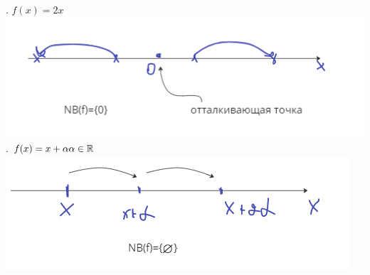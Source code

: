 \documentclass[12pt,a4paper]{article}
\begin{document}
\\
. \(f(x)=2x\) 
\newline \includegraphics[scale=0.5]{images/Section 3. Dinamic System/kaskad2.png}
\\
. \(f(x)=x+\alpha \\ \alpha \in \mathbb{R}\) 
\newline \includegraphics[scale=0.5]{images/Section 3. Dinamic System/kaskad3.png}
\end{document}
